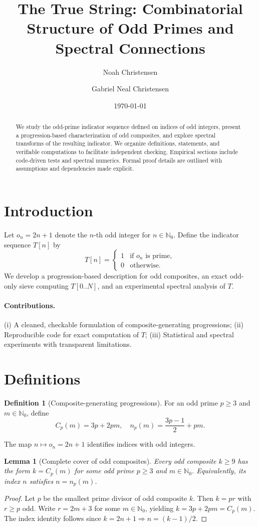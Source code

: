 \documentclass[11pt]{article}
\title{The True String: Combinatorial Structure of Odd Primes and Spectral Connections}
\author{Noah Christensen \and Gabriel Neal Christensen}
\date{\today}
\newtheorem{lemma}{Lemma}
\theoremstyle{definition}
\newtheorem{definition}{Definition}
\theoremstyle{remark}
\begin{document}
\maketitle

\begin{abstract}
We study the odd-prime indicator sequence defined on indices of odd integers, present a progression-based characterization of odd composites, and explore spectral transforms of the resulting indicator. We organize definitions, statements, and verifiable computations to facilitate independent checking. Empirical sections include code-driven tests and spectral numerics. Formal proof details are outlined with assumptions and dependencies made explicit.
\end{abstract}

\section{Introduction}
Let \(o_n = 2n+1\) denote the \(n\)-th odd integer for \(n \in \mathbb{N}_0\). Define the indicator sequence \(T[n]\) by
\[
T[n] = \begin{cases}1 & \text{if } o_n \text{ is prime},\\ 0 & \text{otherwise.}\end{cases}
\]
We develop a progression-based description for odd composites, an exact odd-only sieve computing \(T[0..N]\), and an experimental spectral analysis of \(T\).

\paragraph{Contributions.} (i) A cleaned, checkable formulation of composite-generating progressions; (ii) Reproducible code for exact computation of \(T\); (iii) Statistical and spectral experiments with transparent limitations.

\section{Definitions}
\begin{definition}[Composite-generating progressions]
For an odd prime \(p\ge 3\) and \(m\in\mathbb{N}_0\), define
\[
 C_p(m) = 3p + 2pm, \quad n_p(m) = \frac{3p-1}{2} + pm.
\]
\end{definition}
The map \(n \mapsto o_n=2n+1\) identifies indices with odd integers.

\begin{lemma}[Complete cover of odd composites]
Every odd composite \(k\ge 9\) has the form \(k = C_p(m)\) for some odd prime \(p\ge 3\) and \(m\in\mathbb{N}_0\). Equivalently, its index \(n\) satisfies \(n = n_p(m)\).
\end{lemma}
\begin{proof}
Let \(p\) be the smallest prime divisor of odd composite \(k\). Then \(k=pr\) with \(r\ge p\) odd. Write \(r=2m+3\) for some \(m\in\mathbb{N}_0\), yielding \(k=3p+2pm=C_p(m)\). The index identity follows since \(k=2n+1\Rightarrow n=(k-1)/2\).
\end{proof}
\end{document}
